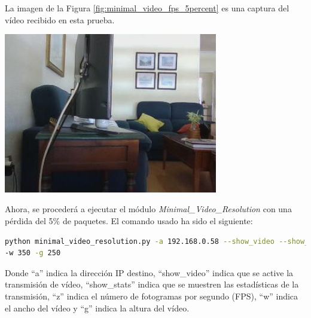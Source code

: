 \newpage
La imagen de la Figura \ref{fig:minimal_video_fps_5percent} es una captura del vídeo recibido en esta prueba.
\begin{center}
  \includegraphics[width = 0.7\textwidth]{images/VideoRecibido7.2.png}
  \label{fig:minimal_video_fps_5percent}
\end{center}
\newpage


Ahora, se procederá a ejecutar el módulo \textit{Minimal\_Video\_Resolution} con una pérdida del 5\% de paquetes. El comando usado ha sido el siguiente:

\begin{lstlisting}[language=bash,basicstyle=\ttfamily\scriptsize]
python minimal_video_resolution.py -a 192.168.0.58 --show_video --show_stats -z 12 \\
-w 350 -g 250
\end{lstlisting}
Donde ``a'' indica la dirección IP destino, ``show\_video'' indica que se active la transmisión de vídeo, ``show\_stats'' indica que se muestren las estadísticas de la transmisión, ``z'' indica el número de fotogramas por segundo (FPS), ``w'' indica el ancho del vídeo y ``g'' indica la altura del vídeo.
\vspace{\baselineskip}

